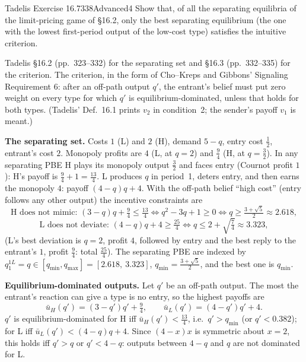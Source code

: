 \begin{exsol}{Tadelis Exercise 16.7}{338}{Advanced}{4}
\asked Show that, of all the separating equilibria of the limit-pricing game of \S16.2, only the best
separating equilibrium (the one with the lowest first-period output of the low-cost type) satisfies the
intuitive criterion.

\method Tadelis \S16.2 (pp.~323--332) for the separating set and \S16.3 (pp.~332--335) for the criterion.
The criterion, in the form of Cho--Kreps and Gibbons' Signaling Requirement 6: after an off-path output
$q'$, the entrant's belief must put zero weight on every type for which $q'$ is
equilibrium-dominated, unless that holds for both types. (Tadelis' Def.~16.1 prints $v_2$ in condition~2;
the sender's payoff $v_1$ is meant.)

\solution \textbf{The separating set.} Costs $1$ (L) and $2$ (H), demand $5 - q$, entry cost $\frac12$, entrant's cost $2$.
Monopoly profits are $4$ (L, at $q = 2$) and $\frac94$ (H, at $q = \frac32$). In any separating PBE
H plays its monopoly output $\frac32$ and faces entry (Cournot profit $1$): H's payoff is
$\frac94 + 1 = \frac{13}{4}$. L produces $q$ in period~1, deters entry, and then earns the monopoly $4$:
payoff $(4 - q)q + 4$. With the off-path belief ``high cost'' (entry follows any other output) the
incentive constraints are
\[
  \text{H does not mimic: } (3 - q)q + \tfrac94 \le \tfrac{13}{4}
  \iff q^2 - 3q + 1 \ge 0 \iff q \ge \tfrac{3 + \sqrt5}{2} \approx 2.618,
\]
\[
  \text{L does not deviate: } (4 - q)q + 4 \ge \tfrac{25}{4}
  \iff q \le 2 + \sqrt{\tfrac74} \approx 3.323,
\]
(L's best deviation is $q = 2$, profit $4$, followed by entry and the best reply to the entrant's $1$,
profit $\frac94$: total $\frac{25}4$). The separating PBE are indexed by $q_1^{1L} = q \in [q_{\min}, q_{\max}] =
[2.618,\ 3.323]$, $q_{\min} = \frac{3 + \sqrt5}{2}$, and the best one is $q_{\min}$.

\textbf{Equilibrium-dominated outputs.} Let $q'$ be an off-path output. The most the entrant's reaction
can give a type is no entry, so the highest payoffs are
\[
  \bar u_H(q') = (3 - q')q' + \tfrac94, \qquad \bar u_L(q') = (4 - q')q' + 4 .
\]
$q'$ is equilibrium-dominated for H iff $\bar u_H(q') < \frac{13}4$, i.e.\ $q' > q_{\min}$ (or
$q' < 0.382$); for L iff $\bar u_L(q') < (4 - q)q + 4$. Since $(4 - x)x$ is symmetric about $x = 2$, this holds iff
$q' > q$ or $q' < 4 - q$: outputs between $4 - q$ and $q$ are not dominated for L.


\end{exsol}
